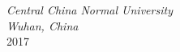 \documentclass[oneside,A4paper,12pt]{article}
\begin{document}
\begin{titlepage}
	\vspace{1.4\baselineskip} %
	
	
	\vfill %
	
	
	
	\vspace{0.3\baselineskip} %
	
	
	\textit{Central China Normal University \\ Wuhan, China \\} %
        \vspace{0.2\baselineskip}
	{\large 2017} %

\end{titlepage}
\newpage
\end{document}

